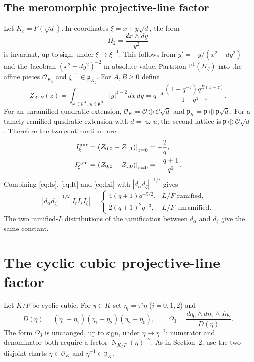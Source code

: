 \documentclass[12pt,letterpaper]{amsart}
\DeclareMathOperator{\Norm}{N}
\begin{document}
\subsection*{The meromorphic projective-line factor}
Let $K_\zeta=F(\sqrt d)$. In coordinates $\xi=x+y\sqrt d$, the form
\begin{equation}\label{eq:quadratic-form}
\Omega_2=\frac{dx\wedge dy}{y^2}
\end{equation}
is invariant, up to sign, under $\xi\mapsto\xi^{-1}$. This follows from $y'=-y/(x^2-dy^2)$ and the Jacobian $(x^2-dy^2)^{-2}$ in absolute value. Partition $\mathbb P^1(K_\zeta)$ into the affine pieces $\mathcal O_{K_\zeta}$ and $\xi^{-1}\in\mathfrak p_{K_\zeta}$. For $A,B\ge0$ define
\begin{equation}\label{eq:Zab}
Z_{A,B}(z)=\int_{x\in\mathfrak p^A\!,\ y\in\mathfrak p^B}|y|^{z-2}\,dx\,dy
=q^{-A}\frac{(1-q^{-1})q^{B(1-z)}}{1-q^{1-z}}.
\end{equation}
For an unramified quadratic extension, $\mathcal O_K=\mathcal O\oplus\mathcal O\sqrt d$ and $\mathfrak p_K=\mathfrak p\oplus\mathfrak p\sqrt d$. For a tamely ramified quadratic extension with $d=\varpi u$, the second lattice is $\mathfrak p\oplus\mathcal O\sqrt d$. Therefore the two continuations are
\begin{align}\label{eq:Ixi}
I_\xi^{\rm unr}&=\left.(Z_{0,0}+Z_{1,1})\right|_{z=0}=-\frac2q,\\
I_\xi^{\rm ram}&=\left.(Z_{0,0}+Z_{1,0})\right|_{z=0}=-\frac{q+1}{q^2}.
\end{align}
Combining \eqref{eq:Is}, \eqref{eq:It} and \eqref{eq:Ixi} with $|d_\alpha d_\zeta|^{-1/2}$ gives
\begin{equation}\label{eq:Cprime}
|d_\alpha d_\zeta|^{-1/2}|I_tI_sI_\xi|=
\begin{cases}
4(q+1)q^{-5/2},& L/F\text{ ramified},\\
2(q+1)^2q^{-3},&L/F\text{ unramified}.
\end{cases}
\end{equation}
The two ramified-$L$ distributions of the ramification between $d_\alpha$ and $d_\zeta$ give the same constant.

\section{The cyclic cubic projective-line factor}
Let $K/F$ be cyclic cubic. For $\eta\in K$ set $\eta_i=\tau^i\eta$ ($i=0,1,2$) and
\[
D(\eta)=(\eta_0-\eta_1)(\eta_1-\eta_2)(\eta_2-\eta_0),\qquad
\Omega_3=\frac{d\eta_0\wedge d\eta_1\wedge d\eta_2}{D(\eta)}.
\]
The form $\Omega_3$ is unchanged, up to sign, under $\eta\mapsto\eta^{-1}$: numerator and denominator both acquire a factor $\Norm_{K/F}(\eta)^{-2}$. As in Section~2, use the two disjoint charts $\eta\in\mathcal O_K$ and $\eta^{-1}\in\mathfrak p_K$.
\end{document}
